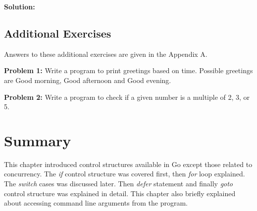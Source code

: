 \textbf{Solution:}



\subsection{Additional Exercises}

Answers to these additional exercises are given in the Appendix A.

\textbf{Problem 1:} Write a program to print greetings based on time.
Possible greetings are Good morning, Good afternoon and Good evening.

\textbf{Problem 2:} Write a program to check if a given number is a multiple of 2, 3, or 5.

\section*{Summary}

This chapter introduced control structures available in Go except those related
to concurrency. The \textit{if} control structure was covered first,
then \textit{for} loop explained. The \textit{switch} cases was discussed later.
Then \textit{defer} statement and finally \textit{goto} control structure was
explained in detail. This chapter also briefly explained about accessing command
line arguments from the program.
